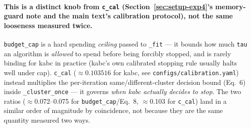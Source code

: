 \documentclass[11pt]{article}
\begin{document}
\paragraph{This is a distinct knob from \texttt{c\_cal}
(Section~\ref{sec:setup-exp4}'s memory-guard note and the main text's
calibration protocol), not the same looseness measured twice.}
\texttt{budget\_cap} is a hard spending \emph{ceiling} passed to
\texttt{\_fit} --- it bounds how much \texttt{tau} an algorithm is
\emph{allowed} to spend before being forcibly stopped, and is rarely
binding for kabc in practice (kabc's own calibrated stopping rule usually
halts well under cap). \texttt{c\_cal} ($\approx 0.103516$ for kabc, see
\texttt{configs/calibration.yaml}) instead multiplies the per-iteration
same/different-cluster decision bound (Eq.~6) inside
\texttt{\_cluster\_once} --- it governs \emph{when kabc actually decides
to stop}. The two ratios ($\approx$0.072--0.075 for
\texttt{budget\_cap}/Eq.~8, $\approx$0.103 for \texttt{c\_cal}) land in a
similar order of magnitude by coincidence, not because they are the same
quantity measured two ways.
\end{document}
